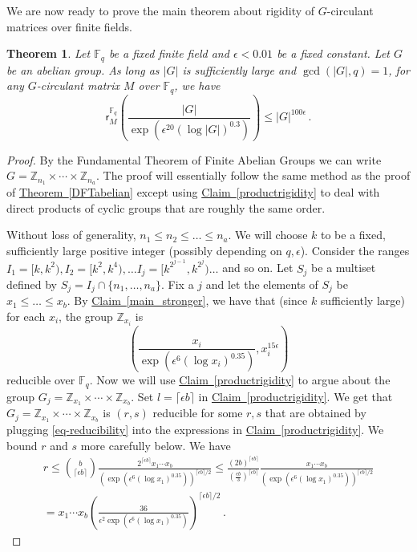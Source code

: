 \documentclass[11pt]{article}
\numberwithin{equation}{section}
\newtheorem{theorem}{Theorem}[section]
\theoremstyle{definition}
\theoremstyle{plain}
\newcommand{\Z}{\mathbb Z}
\newcommand{\expref}[2]{\hyperref[#2]{#1~\ref{#2}}}
\theoremstyle{definition}
\newcommand\F{{\mathbb{F}}}
\renewcommand\Z{{\mathbb{Z}}}
\begin{document}
We are now ready to prove the main theorem about rigidity of
%
$G$-circulant    %
matrices over finite fields.
\begin{theorem}\label{finitefield_allabelian}
Let $\F_q$ be a fixed finite field and $\epsilon < 0.01$ be a fixed constant.  Let $G$ be an abelian group.  As long as $|G|$ is sufficiently large and $\gcd(|G|,q) = 1$, for any 
%
$G$-circulant    %
matrix $M$
%
over $\F_q$, we have
\[
\textsf{r}_M^{\F_q}\left( \frac{|G|}{\exp\left(\epsilon^{20}(\log |G|)^{0.3}\right)}\right) \leq |G|^{100 \epsilon} \,.
\]
\end{theorem}
\begin{proof}
By the Fundamental Theorem of Finite Abelian Groups we can write $G = \Z_{n_1} \times \cdots \times \Z_{n_a}$.  The proof will essentially follow the same method as the proof of 
%
\expref{Theorem}{DFTabelian} 
%
%
%
except using \expref{Claim}{productrigidity} to deal with direct products
of cyclic groups that are roughly the same
%
order.   %


  Without loss of generality, $n_1 \leq n_2 \leq \dots \leq n_a$.  We will choose $k$ to be a fixed, sufficiently large positive integer (possibly depending on $q,\epsilon$).  Consider the ranges $I_1 = [k,k^2), I_2 = [k^2, k^4), \dots I_j = [k^{2^{j-1}},k^{2^j}) \dots $ and so on.  Let $S_j$ be a multiset defined by $S_j = I_j \cap \{n_1, \dots, n_a \}$.  Fix a $j$ and let the elements of $S_j$ be $x_1 \leq \dots \leq x_b$.  By \expref{Claim}{main_stronger}, we have that (since $k$ sufficiently large) for each $x_i$, the group $\Z_{x_i}$ is 
\begin{equation}\label{eq-reducibility}
\left( \frac{x_i}{\exp\left(\epsilon^6(\log x_i)^{0.35}\right)},  x_i^{15 \epsilon}\right) 
\end{equation}
reducible over $\F_q$.  Now we will use \expref{Claim}{productrigidity} to argue about the group $G_j = \Z_{x_1} \times \cdots \times \Z_{x_b}$.  Set $l = \lceil \epsilon b \rceil$ in \expref{Claim}{productrigidity}.  We get that $G_j = \Z_{x_1} \times \cdots \times \Z_{x_b}$ is $(r,s)$ reducible for some $r,s$ that are obtained by plugging \eqref{eq-reducibility} into the expressions in \expref{Claim}{productrigidity}.  We bound $r$ and $s$ more carefully below.  We have
\begin{align*}
r \leq \binom{b}{\lceil \epsilon b \rceil}\frac{2^{\lceil \epsilon b \rceil}x_1 \cdots x_b}{\left(\exp\left(\epsilon^6 (\log x_1)^{0.35}\right)\right)^{\lceil \epsilon b \rceil/2}} \leq \frac{(2b)^{\lceil \epsilon b \rceil}}{( \frac{\epsilon b}{3})^{\lceil \epsilon b \rceil}}\frac{x_1 \cdots x_b}{\left(\exp\left(\epsilon^6 (\log x_1)^{0.35}\right)\right)^{\lceil \epsilon b \rceil/2}} \\ = x_1 \cdots x_b\left( \frac{36}{\epsilon^2 \exp\left(\epsilon^6 (\log x_1)^{0.35}\right)} \right)^{\lceil \epsilon b \rceil/2} \,.
\end{align*}




\end{proof}
\end{document}
